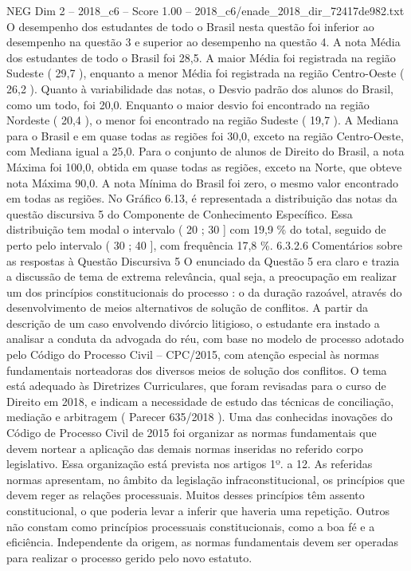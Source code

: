 \begin{textsample}{NEG Dim 2 – 2018\_c6 – Score 1.00 – 2018\_c6/enade\_2018\_dir\_72417de982.txt}
O desempenho dos estudantes de todo o Brasil nesta questão foi inferior ao desempenho na questão 3 e superior ao desempenho na questão 4.
A nota Média dos estudantes de todo o Brasil foi 28,5.
A maior Média foi registrada na região Sudeste ( 29,7 ), enquanto a menor Média foi registrada na região Centro-Oeste ( 26,2 ).
Quanto à variabilidade das notas, o Desvio padrão dos alunos do Brasil, como um todo, foi 20,0.
Enquanto o maior desvio foi encontrado na região Nordeste ( 20,4 ), o menor foi encontrado na região Sudeste ( 19,7 ).
A Mediana para o Brasil e em quase todas as regiões foi 30,0, exceto na região Centro-Oeste, com Mediana igual a 25,0.
Para o conjunto de alunos de Direito do Brasil, a nota Máxima foi 100,0, obtida em quase todas as regiões, exceto na Norte, que obteve nota Máxima 90,0.
A nota Mínima do Brasil foi zero, o mesmo valor encontrado em todas as regiões.
No Gráfico 6.13, é representada a distribuição das notas da questão discursiva 5 do Componente de Conhecimento Específico.
Essa distribuição tem modal o intervalo ( 20 ; 30 ] com 19,9 \% do total, seguido de perto pelo intervalo ( 30 ; 40 ], com frequência 17,8 \%. 6.3.2.6 Comentários sobre as respostas à Questão Discursiva 5 O enunciado da Questão 5 era claro e trazia a discussão de tema de extrema relevância, qual seja, a preocupação em realizar um dos princípios constitucionais do processo : o da duração razoável, através do desenvolvimento de meios alternativos de solução de conflitos.
A partir da descrição de um caso envolvendo divórcio litigioso, o estudante era instado a analisar a conduta da advogada do réu, com base no modelo de processo adotado pelo Código do Processo Civil – CPC/2015, com atenção especial às normas fundamentais norteadoras dos diversos meios de solução dos conflitos.
O tema está adequado às Diretrizes Curriculares, que foram revisadas para o curso de Direito em 2018, e indicam a necessidade de estudo das técnicas de conciliação, mediação e arbitragem ( Parecer 635/2018 ).
Uma das conhecidas inovações do Código de Processo Civil de 2015 foi organizar as normas fundamentais que devem nortear a aplicação das demais normas inseridas no referido corpo legislativo.
Essa organização está prevista nos artigos 1º. a 12.
As referidas normas apresentam, no âmbito da legislação infraconstitucional, os princípios que devem reger as relações processuais.
Muitos desses princípios têm assento constitucional, o que poderia levar a inferir que haveria uma repetição.
Outros não constam como princípios processuais constitucionais, como a boa fé e a eficiência.
Independente da origem, as normas fundamentais devem ser operadas para realizar o processo gerido pelo novo estatuto.

\end{textsample}

